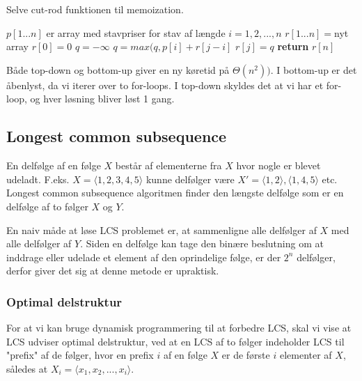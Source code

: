\begin{algorithm}[H]
  \caption{Selve cut-rod funktionen til memoization.}
  \begin{algorithmic}[1]
    \State $p[1...n]$ er array med stavpriser for stav af længde $i=1, 2, ..., n$
    \State $r[1...n] = $nyt array
    \State $r[0] = 0$
    \State $q = -\infty$
    \State $q = max(q, p[i] + r[j-i]$
    \EndFor
    \State $r[j] = q$
    \EndFor
    \State \textbf{return} $r[n]$
    \EndFunction
  \end{algorithmic}
\end{algorithm}

Både top-down og bottom-up giver en ny køretid på $\Theta(n^2))$. I bottom-up er det åbenlyst, da vi iterer over to for-loops. I top-down skyldes det at vi har et for-loop, og hver løsning bliver løst 1 gang.\\



\subsection{Longest common subsequence}
En delfølge af en følge $X$ består af elementerne fra $X$ hvor nogle er blevet udeladt. F.eks. $X= \langle 1, 2, 3, 4, 5\rangle$ kunne delfølger være $X' = {\langle 1, 2\rangle}, \langle 1, 4, 5\rangle$ etc.\\

Longest common subsequence algoritmen finder den længste delfølge som er en delfølge af to følger $X$ og $Y$.

En naiv måde at løse LCS problemet er, at sammenligne alle delfølger af $X$ med alle delfølger af $Y$.
Siden en delfølge kan tage den binære beslutning om at inddrage eller udelade et element af den oprindelige følge, er der $2^n$ delfølger, derfor giver det sig at denne metode er upraktisk.

\subsubsection{Optimal delstruktur}
For at vi kan bruge dynamisk programmering til at forbedre LCS, skal vi vise at LCS udviser optimal delstruktur, ved at en LCS af to følger indeholder LCS til "prefix" af de følger, hvor en prefix $i$ af en følge $X$ er de første $i$ elementer af $X$, således at $X_i = \langle x_1, x_2, ..., x_i\rangle$.\\

